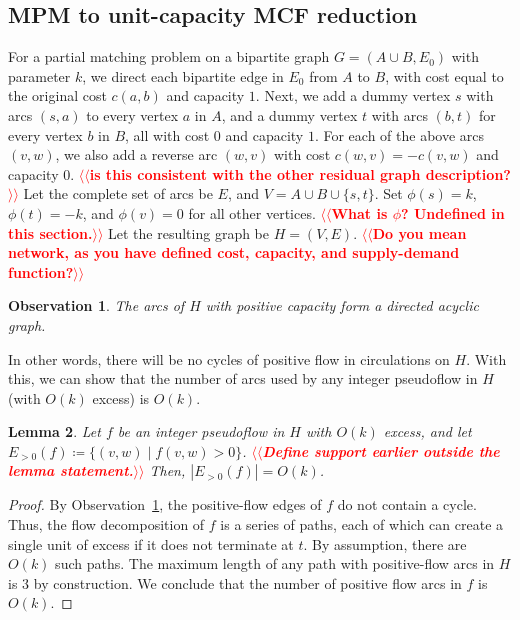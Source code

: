 \documentclass[11pt]{article}
\makeatletter
\def\fsupply{\phi}
\theoremstyle{plain}
\newtheorem{lemma}{Lemma}[section]
\newtheorem{observation}[lemma]{Observation}
\numberwithin{figure}{section}
\def\n@te#1{\textsf{\boldmath \textbf{$\langle\!\langle$#1$\rangle\!\rangle$}}\leavevmode}
\def\note#1{\textcolor{red}{\n@te{#1}}}
\makeatother
\begin{document}
\subsection{MPM to unit-capacity MCF reduction}
\label{subsection:mcm_mcf_reduction}

For a partial matching problem on a bipartite graph $G = (A \cup B, E_0)$ with parameter $k$, we
direct each bipartite edge in $E_0$ from $A$ to $B$, with cost equal to the
original cost $c(a, b)$ and capacity $1$.
Next, we add a dummy vertex $s$ with arcs $(s, a)$ to every vertex $a$ in $A$,
and a dummy vertex $t$ with arcs $(b, t)$ for every vertex $b$ in $B$,
all with cost $0$ and capacity $1$.
For each of the above arcs $(v, w)$, we also add a reverse arc $(w, v)$ with
cost $c(w, v) = -c(v, w)$ and capacity $0$. \note{is this consistent with the other residual graph description?}
Let the complete set of arcs be $E$, and $V = A \cup B \cup \{s, t\}$.
Set $\fsupply(s) = k$, $\fsupply(t) = -k$, and $\fsupply(v) = 0$ for all other
vertices. \note{What is $\phi$?  Undefined in this section.}
Let the resulting graph be $H = (V, E)$. \note{Do you mean network, as you have defined cost, capacity, and supply-demand function?}

\begin{observation}
\label{observation:dag}
	The arcs of $H$ with positive capacity form a directed acyclic graph.
\end{observation}

In other words, there will be no cycles of positive flow in circulations on
$H$.
With this, we can show that the number of arcs used by any integer pseudoflow
in $H$ (with $O(k)$ excess) is $O(k)$.

\begin{lemma}
\label{lemma:reduction_count}
Let $f$ be an integer pseudoflow in $H$ with $O(k)$ excess, and let
$E_{>0}(f) \coloneqq \{(v, w) \mid f(v, w) > 0\}$. \note{Define support earlier outside the lemma statement.}
Then, $|E_{>0}(f)| = O(k)$.
\end{lemma}

\begin{proof}
By Observation~\ref{observation:dag}, the positive-flow edges of $f$ do not
contain a cycle.
Thus, the flow decomposition of $f$ is a series of paths, each of which can
create a single unit of excess if it does not terminate at $t$.
By assumption, there are $O(k)$ such paths.
The maximum length of any path with positive-flow arcs in $H$ is $3$ by construction.
We conclude that the number of positive flow arcs in $f$ is $O(k)$.
\end{proof}
\end{document}
